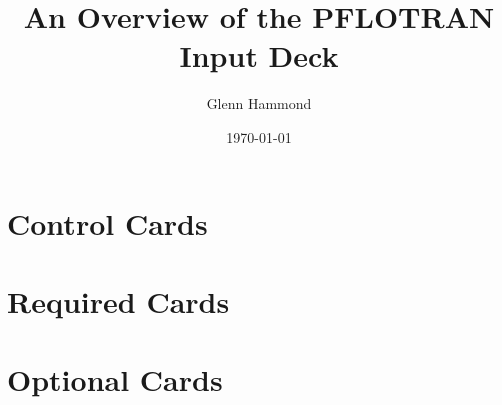 \documentclass{beamer}
\title{An Overview of the PFLOTRAN Input Deck}
\author{Glenn Hammond}
\date{\today}
\begin{document}
\frame{\titlepage}

\begin{frame}
\tableofcontents[]
\end{frame}

\section{Control Cards}


\section{Required Cards}







\section{Optional Cards}



\end{document}
